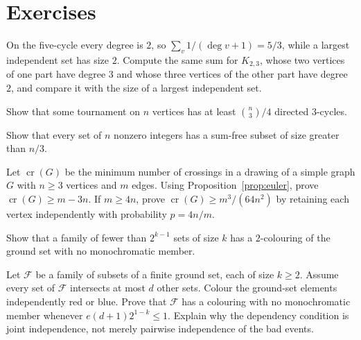 \section{Exercises}

\begin{exercise}[$\star$]\label{ex:carowei}
On the five-cycle every degree is $2$, so $\sum_v 1/(\deg v+1)=5/3$, while a largest independent set has size $2$. Compute the same sum for $K_{2,3}$, whose two vertices of one part have degree $3$ and whose three vertices of the other part have degree $2$, and compare it with the size of a largest independent set.
\end{exercise}

\begin{exercise}[$\star$]\label{ex:tournament}
Show that some tournament on $n$ vertices has at least $\binom{n}{3}/4$ directed $3$-cycles.
\end{exercise}

\begin{exercise}[$\star\star$]\label{ex:sumfree}
Show that every set of $n$ nonzero integers has a sum-free subset of size greater than $n/3$.
\end{exercise}

\begin{exercise}[$\star\star$]\label{ex:crossing}
Let $\operatorname{cr}(G)$ be the minimum number of crossings in a drawing of a simple graph $G$ with $n\ge3$ vertices and $m$ edges. Using Proposition~\ref{prop:euler}, prove $\operatorname{cr}(G)\ge m-3n$. If $m\ge4n$, prove $\operatorname{cr}(G)\ge m^3/(64n^2)$ by retaining each vertex independently with probability $p=4n/m$.
\end{exercise}

\begin{exercise}[$\star$]\label{ex:propertyb}
Show that a family of fewer than $2^{k-1}$ sets of size $k$ has a $2$-colouring of the ground set with no monochromatic member.
\end{exercise}


\begin{exercise}[$\star\star$]\label{ex:localcolour}
Let $\mathcal F$ be a family of subsets of a finite ground set, each of size $k\ge2$. Assume every set of $\mathcal F$ intersects at most $d$ other sets. Colour the ground-set elements independently red or blue. Prove that $\mathcal F$ has a colouring with no monochromatic member whenever $e(d+1)2^{1-k}\le1$. Explain why the dependency condition is joint independence, not merely pairwise independence of the bad events.
\end{exercise}


